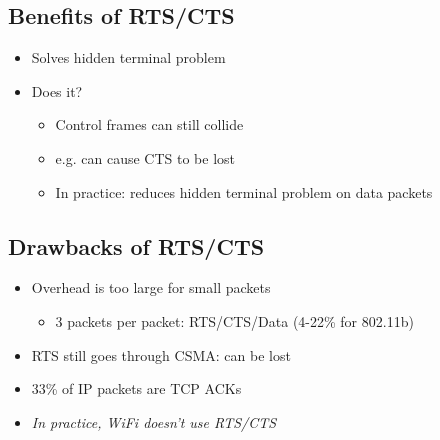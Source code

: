 \begin{figure}[H]
\end{figure}

\subsection{Benefits of RTS/CTS}
\begin{itemize}[nosep]
    \item Solves hidden terminal problem
    \item Does it?
          \begin{itemize}[nosep]
              \item Control frames can still collide
              \item e.g. can cause CTS to be lost
              \item In practice: reduces hidden terminal problem on data packets
          \end{itemize}
\end{itemize}

\subsection{Drawbacks of RTS/CTS}
\begin{itemize}[nosep]
    \item Overhead is too large for small packets
          \begin{itemize}[nosep]
              \item 3 packets per packet: RTS/CTS/Data (4-22\% for 802.11b)
          \end{itemize}
    \item RTS still goes through CSMA: can be lost
    \item 33\% of IP packets are TCP ACKs
    \item \emph{In practice, WiFi doesn't use RTS/CTS}
\end{itemize}

